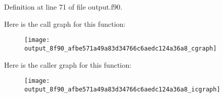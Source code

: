 Definition at line 71 of file output.f90.



Here is the call graph for this function:\nopagebreak
\begin{figure}[H]
\begin{center}
\leavevmode
\texttt{[image: output\_8f90\_afbe571a49a83d34766c6aedc124a36a8\_cgraph]}
\end{center}
\end{figure}




Here is the caller graph for this function:\nopagebreak
\begin{figure}[H]
\begin{center}
\leavevmode
\texttt{[image: output\_8f90\_afbe571a49a83d34766c6aedc124a36a8\_icgraph]}
\end{center}
\end{figure}


